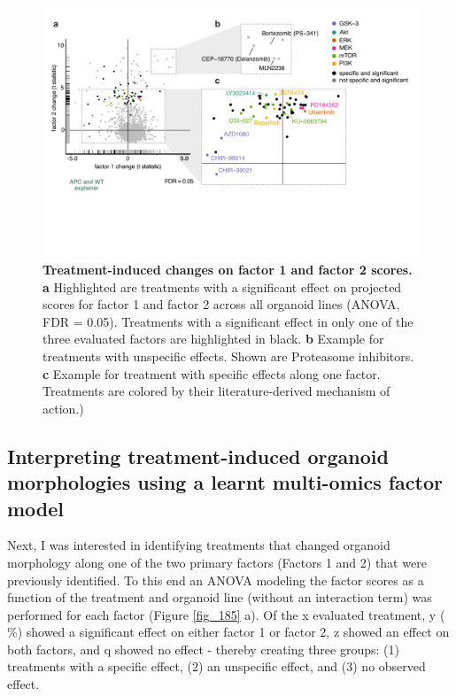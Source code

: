 \begin{flushleft}
\begin{figure}[h]
\centering
\includegraphics[scale=0.75,
                keepaspectratio]{figures/adenomaprofiling/pdf/fig_5_3_1.pdf}
\caption[Treatment-induced changes on factor 1 and factor 2 scores]{\textbf{Treatment-induced changes on factor 1 and factor 2 scores. a} Highlighted are treatments with a significant effect on projected scores for factor 1 and factor 2 across all organoid lines (ANOVA, FDR = 0.05). Treatments with a significant effect in only one of the three evaluated factors are highlighted in black. \textbf{b} Example for treatments with unspecific effects. Shown are Proteasome inhibitors. \textbf{c} Example for treatment with specific effects along one factor. Treatments are colored by their literature-derived mechanism of action.)}
\label{fig_180}
\end{figure}
\bigbreak

\subsection{Interpreting treatment-induced organoid morphologies using a learnt multi-omics factor model}

Next, I was interested in identifying treatments that changed organoid morphology along one of the two primary factors (Factors 1 and 2) that were previously identified. To this end an ANOVA modeling the factor scores as a function of the treatment and organoid line (without an interaction term) was performed for each factor (Figure \ref{fig_185} a). Of the x evaluated treatment, y ( \%) showed a significant effect on either factor 1 or factor 2, z showed an effect on both factors, and q showed no effect - thereby creating three groups: (1) treatments with a specific effect, (2) an unspecific effect, and (3) no observed effect. 
\par


\end{flushleft}
